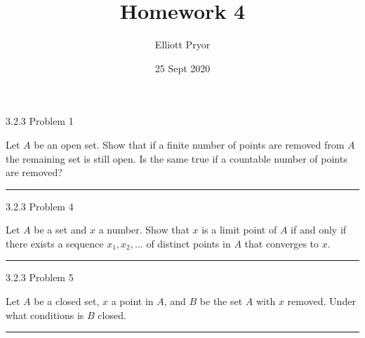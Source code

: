 \documentclass[11pt]{article}
\title{Homework 4}
\author{Elliott Pryor}
\date{25 Sept 2020}
\begin{document}
\maketitle



 3.2.3 Problem 1

Let $A$ be an open set. Show that if a finite number of points are removed from $A$ the remaining set is still open. Is the same true if a countable number of points are removed?

\hrule


\newpage
{} 3.2.3 Problem 4

Let $A$ be a set and $x$ a number. Show that $x$ is a limit point of $A$ if and only if there exists a sequence $x_1, x_2, ...$ of distinct points in $A$ that converges to $x$.

\hrule

\newpage
{} 3.2.3 Problem 5

Let $A$ be a closed set, $x$ a point in $A$, and $B$ be the set $A$ with $x$ removed. Under what conditions is $B$ closed. 

\hrule
\end{document}
